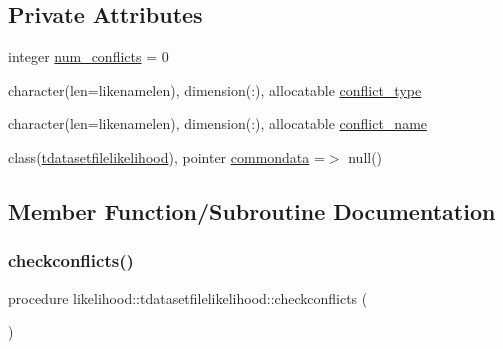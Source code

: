 \subsection*{Private Attributes}
\begin{DoxyCompactItemize}
\item 
integer \mbox{\hyperlink{structlikelihood_1_1tdatasetfilelikelihood_a56250e540d1e3dc78919208eaa09b004}{num\+\_\+conflicts}} = 0
\item 
character(len=likenamelen), dimension(\+:), allocatable \mbox{\hyperlink{structlikelihood_1_1tdatasetfilelikelihood_a9ab38b6367b5c04d8ab38ff324eeb401}{conflict\+\_\+type}}
\item 
character(len=likenamelen), dimension(\+:), allocatable \mbox{\hyperlink{structlikelihood_1_1tdatasetfilelikelihood_a022bcccc9bd1780ef59c2ce67d7ca814}{conflict\+\_\+name}}
\item 
class(\mbox{\hyperlink{structlikelihood_1_1tdatasetfilelikelihood}{tdatasetfilelikelihood}}), pointer \mbox{\hyperlink{structlikelihood_1_1tdatasetfilelikelihood_a2e415cd4d075722104142f24cb7e617e}{commondata}} =$>$ null()
\end{DoxyCompactItemize}


\subsection{Member Function/\+Subroutine Documentation}
\mbox{\label{structlikelihood_1_1tdatasetfilelikelihood_a6e34c0c228fbf1ed51e5a73958b8edad}} 
\subsubsection{\texorpdfstring{checkconflicts()}{checkconflicts()}}
{\footnotesize\ttfamily procedure likelihood\+::tdatasetfilelikelihood\+::checkconflicts (\begin{DoxyParamCaption}{ }\end{DoxyParamCaption})\hspace{0.3cm}{\ttfamily [private]}}

\mbox{\label{structlikelihood_1_1tdatasetfilelikelihood_a1fcdd4abd25e49f8b0deebfc287160d9}} 
